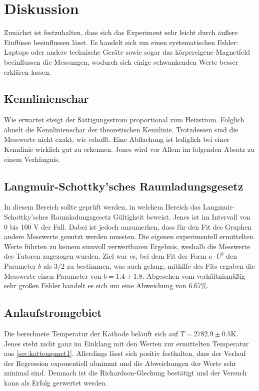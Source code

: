 \section{Diskussion}
\label{sec:Diskussion}

Zunächst ist festzuhalten, dass sich das Experiment sehr leicht durch äußere 
Einflüsse beeinflussen lässt. Es handelt sich um einen systematischen Fehler:
Laptops oder andere technische Geräte sowie sogar das körpereigene Magnetfeld 
beeinflussen die Messungen, wodurch sich einige schwankenden Werte besser 
erklären lassen. 

\subsection{Kennlinienschar}
Wie erwartet steigt der Sättigungsstrom proportional zum Heizstrom. Folglich 
ähnelt die Kennlinienschar der theoretischen Kennlinie. Trotzdessen sind die 
Messwerte nicht exakt, wie erhofft. Eine Abflachung ist lediglich bei einer 
Kennlinie wirklich gut zu erkennen. Jenes wird vor Allem im folgenden Absatz 
zu einem Verhängnis.

\subsection{Langmuir-Schottky'sches Raumladungsgesetz}
In diesem Bereich sollte geprüft werden, in welchem Bereich das Langmuir-
Schottky'sches Raumladungsgesetz Gültigkeit beweist. Jenes ist im Intervall
von 0 bis 100 $\unit{\volt}$ der Fall. Dabei ist jedoch anzumerken, dass für 
den Fit des Graphen andere Messwerte genutzt werden mussten. Die eigenen
experimentell ermittelten Werte führten zu keinem sinnvoll verwertbaren 
Ergebnis, weshalb die Messwerte des Tutoren zugezogen wurden.
Ziel war es, bei dem Fit der Form $a \cdot U^b$ den Parameter $b$ als $3/2$ 
zu bestimmen, was auch gelang; mithilfe des Fits ergaben die Messwerte einen 
Parameter von $b = 1.4 \pm 1.8$. Abgesehen vom verhältnismäßig sehr großen 
Fehler handelt es sich um eine Abweichung von 6.67\%.

\subsection{Anlaufstromgebiet}
Die berechnete Temperatur der Kathode beläuft sich auf $T = 2782.9 \pm 0.5 \unit{\kelvin}$.
Jenes steht nicht ganz im Einklang mit den Werten zur ermittelten Temperatur 
aus \autoref{sec:kattempmet1}. Allerdings lässt sich positiv festhalten, dass 
der Verlauf der Regression exponentiell abnimmt und die Abweichungen der Werte 
sehr minimal sind. Demnach ist die Richardson-Glechung bestätigt und der Versuch 
kann als Erfolg gerwertet werden.

